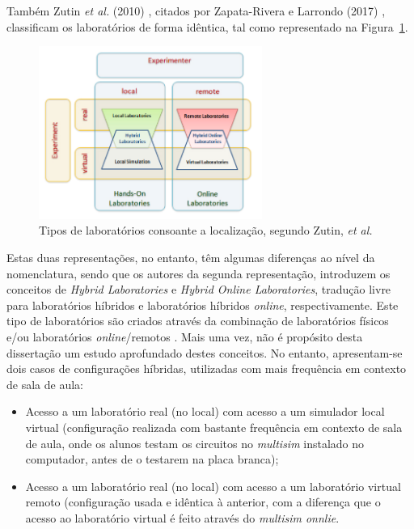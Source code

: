 Também Zutin \textit{et al.} (2010) \cite{zutinlab2go}, citados por Zapata-Rivera e Larrondo (2017) \cite{Zapata-Rivera}, classificam os laboratórios de forma idêntica, tal como representado na Figura~\ref{fig:classificaçãozutin}.

\begin{figure}[hbtp]
    \centering
    \includegraphics[width=0.65\textwidth]{figures/carac_lab.png}
    \caption{Tipos de laboratórios consoante a localização, segundo Zutin, \textit{et al.} \cite{zutinlab2go}}
    \label{fig:classificaçãozutin}
\end{figure}

Estas duas representações, no entanto, têm algumas diferenças ao nível da nomenclatura, sendo que os autores da segunda representação, introduzem os conceitos de \textit{Hybrid Laboratories} e \textit{Hybrid Online Laboratories}, tradução livre para laboratórios híbridos e laboratórios híbridos \textit{online}, respectivamente. Este tipo de laboratórios são criados através da combinação de laboratórios físicos e/ou laboratórios \textit{online}/remotos \cite{Zapata-Rivera}. Mais uma vez, não é propósito desta dissertação um estudo aprofundado destes conceitos. No entanto, apresentam-se dois casos de configurações híbridas, utilizadas com mais frequência em contexto de sala de aula:

\begin{itemize}
    \item Acesso a um laboratório real (no local) com acesso a um simulador local virtual (configuração realizada com bastante frequência em contexto de sala de aula, onde os alunos testam os circuitos no \textit{multisim} instalado no computador, antes de o testarem na placa branca);
    \item Acesso a um laboratório real (no local) com acesso a um laboratório virtual remoto (configuração usada e idêntica à anterior, com a diferença que o acesso ao laboratório virtual é feito através do \textit{multisim onnlie}.
\end{itemize}

